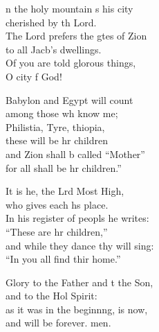 \settowidth{\versewidth}{In his register of peoples he writes: *}
\begin{psalmverse}%
  \begin{patverse}
n the holy mountain \pointup{\i}s his city\Med\\
cherished by th Lord.\\
The Lord prefers the gtes of Zion\Med\\
to all Jacb’s dwellings.\\
Of you are told glor\pointup{\i}ous things,\Med\\
O city f God!

Babylon and Egypt  will count\Med\\
among those wh know me;\\
Philistia, Tyre, thiopia,\Med\\
these will be hr children\\
and Zion shall b called “Mother”\Med\\
for all shall be hr children.”

It is he, the Lrd Most High,\Med\\
who gives each h\pointup{\i}s place.\\
In his register of peopls he writes:\Med\\
“These are hr children,”\\
and while they dance thy will sing:\Med\\
“In you all find thir home.”

Glory to the Father and t the Son,\Med\\
and to the Hol Spirit:\\
as it was in the beginn\pointup{\i}ng, is now,\Med\\
and will be forever. men.
  \end{patverse}
\end{psalmverse}
